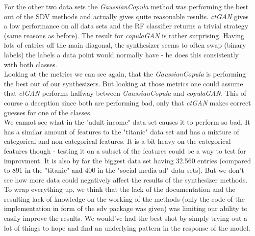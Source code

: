 \documentclass{article}
\begin{document}
For the other two data sets the \textit{GaussianCopula} method was performing the best out of the SDV methods and actually gives quite reasonable results. \textit{ctGAN} gives a low performance on all data sets and the RF classifier returns a trivial strategy (same reasons as before). The result for \textit{copulaGAN} is rather surprising. Having lots of entries off the main diagonal, the synthesizer seems to often swap (binary labels) the labels a data point would normally have - he does this consistently with both classes. \\

Looking at the metrics we can see again, that the \textit{GaussianCopula} is performing the best out of our synthesizers. But looking at those metrics one could assume that \textit{ctGAN} performs halfway between \textit{GaussianCopula} and \textit{copulaGAN}. This of course a deception since both are performing bad, only that \textit{ctGAN} makes correct guesses for one of the classes. \\

We cannot see what in the "adult income" data set causes it to perform so bad. It has a similar amount of features to the "titanic" data set and has a mixture of categorical and non-categorical features. It is a bit heavy on the categorical features though - testing it on a subset of the features could be a way to test for improvment. It is also by far the biggest data set having 32.560 entries (compared to 891 in the "titanic" and 400 in the "social media ad" data sets). But we don't see how more data could negatively affect the results of the synthesizer methods. \\

To wrap everything up, we think that the lack of the documentation and the resulting lack of knowledge on the working of the methods (only the code of the implementation in form of the sdv package was given) was limiting our ability to easily improve the results. We would've had the best shot by simply trying out a lot of things to hope and find an underlying pattern in the response of the model.

\clearpage
{}

\end{document}
